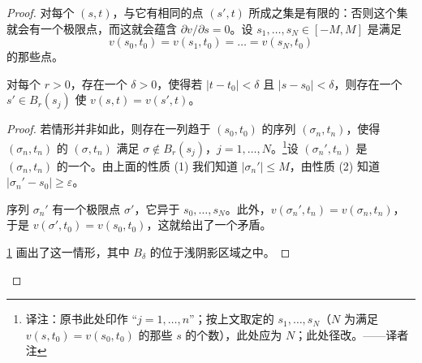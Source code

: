 \begin{proof}
对每个 $(s,t)$，与它有相同\trImage{}的点 $(s',t)$ 所成之集是有限的：否则这个集就会有一个极限点，而这就会蕴含 $\partial v/\partial s=0$。设 $s_1,\dots,s_N\in[-M,M]$ 是满足
\[
v(s_0,t_0)=v(s_1,t_0)=\dots=v(s_N,t_0)
\]
的那些点。

\begin{lemma}\label{thm:multiple-nearby}
对每个 $r>0$，存在一个 $\delta>0$，使得若 $|t-t_0|<\delta$ 且 $|s-s_0|<\delta$，则存在一个 $s'\in B_r(s_j)$ 使 $v(s,t)=v(s',t)$。
\end{lemma}

\begin{proof}
若情形并非如此，则存在一列趋于 $(s_0,t_0)$ 的序列 $(\sigma_n,t_n)$，使得 $(\sigma_n,t_n)$ 的\trMultiplePoint{} $(\sigma,t_n)$ 满足 $\sigma\notin B_r(s_j)$，$j=1,\dots,N$。\footnote{译注：原书此处印作 “$j=1,\dots,n$”；按上文取定的 $s_1,\dots,s_N$（$N$ 为满足 $v(s,t_0)=v(s_0,t_0)$ 的那些 $s$ 的个数），此处应为 $N$；此处径改。——译者注}设 $(\sigma_n',t_n)$ 是 $(\sigma_n,t_n)$ 的一个\trMultiplePoint。由上面的性质 (1) 我们知道 $|\sigma_n'|\le M$，由性质 (2) 知道 $|\sigma_n'-s_0|\ge\varepsilon$。

序列 $\sigma_n'$ 有一个极限点 $\sigma'$，它异于 $s_0,\dots,s_N$。此外，$v(\sigma_n',t_n)=v(\sigma_n,t_n)$，于是 $v(\sigma',t_0)=v(s_0,t_0)$，这就给出了一个矛盾。

\cref{fig:multiple-boxes} 画出了这一情形，其中 $B_\delta$ 的\trMultiplePoint{}位于浅阴影区域之中。
\end{proof}

\begin{figure}[htbp]
\centering
{}
\caption{}
\label{fig:multiple-boxes}
\end{figure}


\end{proof}
